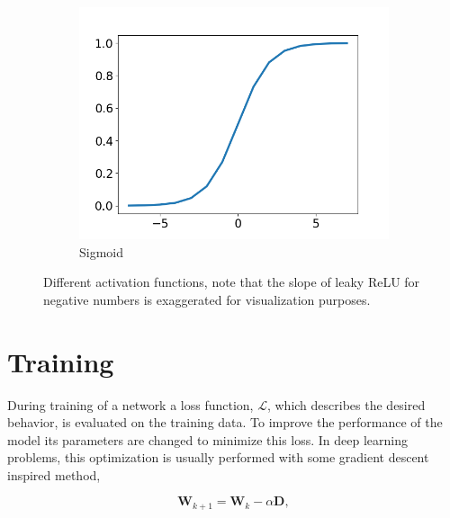 \begin{figure}
\begin{subfigure}[t]{0.3\textwidth}
    \includegraphics[width=\textwidth]{files/figs/backg/sigmoid.png}
    \caption{Sigmoid}
    \label{fig:sigmoid}
  \end{subfigure}
  \caption{Different activation functions, note that the slope of leaky ReLU for negative numbers is exaggerated for visualization purposes. }
  \label{fig:activations}
\end{figure}



\section{Training}

During training of a network a loss function, $\mathcal{L}$, which describes the desired behavior, is evaluated on the training data. To improve the performance of the model its parameters are changed to minimize this loss. In deep learning problems, this optimization is usually performed with some gradient descent inspired method,

\begin{equation}
 \pmb{W}_{k+1} = \pmb{W}_k - \alpha \pmb{D},
 \label{eq:grad-desc}
\end{equation}

